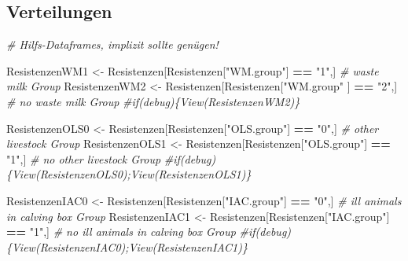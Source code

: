 \documentclass[
]{article}
\newenvironment{Shaded}{\begin{snugshade}}{\end{snugshade}}
\newcommand{\CommentTok}[1]{\textcolor[rgb]{0.56,0.35,0.01}{\textit{#1}}}
\newcommand{\NormalTok}[1]{#1}
\newcommand{\OperatorTok}[1]{\textcolor[rgb]{0.81,0.36,0.00}{\textbf{#1}}}
\newcommand{\StringTok}[1]{\textcolor[rgb]{0.31,0.60,0.02}{#1}}
\begin{document}
\hypertarget{verteilungen}{%
\subsection{Verteilungen}\label{verteilungen}}

\begin{Shaded}
\begin{Highlighting}[]
\CommentTok{# Hilfs-Dataframes, implizit sollte genügen!}

\NormalTok{ResistenzenWM1  <-}\StringTok{ }\NormalTok{Resistenzen[Resistenzen[}\StringTok{"WM.group"}\NormalTok{]  }\OperatorTok{==}\StringTok{ "1"}\NormalTok{,]  }\CommentTok{#    waste milk Group}
\NormalTok{ResistenzenWM2  <-}\StringTok{ }\NormalTok{Resistenzen[Resistenzen[}\StringTok{"WM.group"}\NormalTok{ ] }\OperatorTok{==}\StringTok{ "2"}\NormalTok{,]  }\CommentTok{# no waste milk Group}
\CommentTok{#if(debug)\{View(ResistenzenWM2)\}}

\NormalTok{ResistenzenOLS0 <-}\StringTok{ }\NormalTok{Resistenzen[Resistenzen[}\StringTok{"OLS.group"}\NormalTok{] }\OperatorTok{==}\StringTok{ "0"}\NormalTok{,]  }\CommentTok{#    other livestock Group}
\NormalTok{ResistenzenOLS1 <-}\StringTok{ }\NormalTok{Resistenzen[Resistenzen[}\StringTok{"OLS.group"}\NormalTok{] }\OperatorTok{==}\StringTok{ "1"}\NormalTok{,]  }\CommentTok{# no other livestock  Group}
\CommentTok{#if(debug)\{View(ResistenzenOLS0);View(ResistenzenOLS1)\}}

\NormalTok{ResistenzenIAC0 <-}\StringTok{ }\NormalTok{Resistenzen[Resistenzen[}\StringTok{"IAC.group"}\NormalTok{] }\OperatorTok{==}\StringTok{ "0"}\NormalTok{,]  }\CommentTok{#    ill animals in calving box Group}
\NormalTok{ResistenzenIAC1 <-}\StringTok{ }\NormalTok{Resistenzen[Resistenzen[}\StringTok{"IAC.group"}\NormalTok{] }\OperatorTok{==}\StringTok{ "1"}\NormalTok{,]  }\CommentTok{# no ill animals in calving box Group}
\CommentTok{#if(debug)\{View(ResistenzenIAC0);View(ResistenzenIAC1)\}}


\end{Highlighting}
\end{Shaded}
\end{document}
